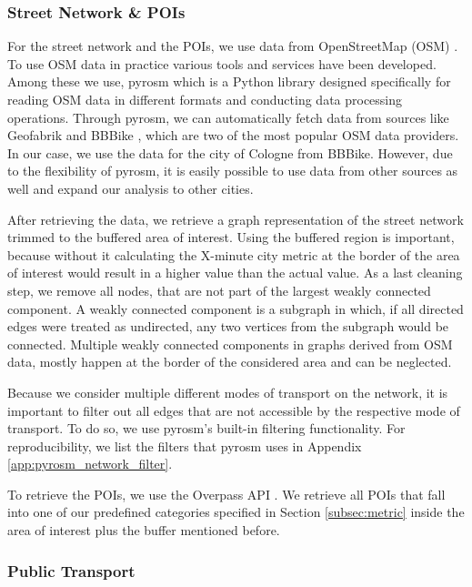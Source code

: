 \subsubsection{Street Network \& POIs}
\label{subs:street_network_pois}

For the street network and the POIs, we use data from OpenStreetMap (OSM) .
To use OSM data in practice various tools and services have been developed.
Among these we use, pyrosm  which is a Python library designed specifically for reading OSM data in different formats and conducting data processing operations.
Through pyrosm, we can automatically fetch data from sources like Geofabrik \cite{GeofabrikDownloadServer} and BBBike \cite{BBBikeExtractsOpenStreetMap}, which are two of the most popular OSM data providers.
In our case, we use the data for the city of Cologne from BBBike.
However, due to the flexibility of pyrosm, it is easily possible to use data from other sources as well and expand our analysis to other cities.

After retrieving the data, we retrieve a graph representation of the street network trimmed to the buffered area of interest.
Using the buffered region is important, because without it calculating the X-minute city metric at the border of the area of interest would result in a higher value than the actual value.
As a last cleaning step, we remove all nodes, that are not part of the largest weakly connected component.
A weakly connected component is a subgraph in which, if all directed edges were treated as undirected, any two vertices from the subgraph would be connected.
Multiple weakly connected components in graphs derived from OSM data, mostly happen at the border of the considered area and can be neglected.

Because we consider multiple different modes of transport on the network, it is important to filter out all edges that are not accessible by the respective mode of transport.
To do so, we use pyrosm's built-in filtering functionality.
For reproducibility, we list the filters that pyrosm uses in Appendix \ref{app:pyrosm_network_filter}.

To retrieve the POIs, we use the Overpass API .
We retrieve all POIs that fall into one of our predefined categories specified in Section \ref{subsec:metric} inside the area of interest plus the buffer mentioned before.

\subsubsection{Public Transport}
\label{subs:public_transport}

